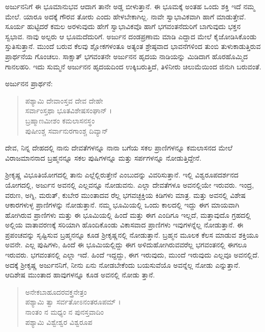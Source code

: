 ಅರ್ಜುನನಿಗೆ ಈ ಭೂಮಾನುಭವ ಆದಾಗ ತಾನೇ ಅಡ್ಡ ಬೀಳುತ್ತಾನೆ. ಈ ಭೂಮಕ್ಕೆ ಅಂತಹ ಒಂದು ಶಕ್ತಿ ಇದೆ ನಮ್ಮ ಮೇಲೆ. ಯಾರೂ ಅದಕ್ಕೆ ಗೌರವ ತೋರು ಎಂದು ಹೇಳಬೇಕಾಗಿಲ್ಲ. ನಾವೇ ಸ್ವಾಭಾವಿಕವಾಗಿ ಹಾಗೆ ಮಾಡುತ್ತೇವೆ. ಸೂರ್ಯ ಹುಟ್ಟಿದರೆ ಕಮಲ ಅರಳುವುದು ಹೇಗೆ ಸ್ವಾಭಾವಿಕವೊ ಹಾಗೆ ಭಗವಂತನೆದುರಿಗೆ ಬಾಗುವುದು ಭಕ್ತನ ಸ್ವಭಾವ. ನಾವು ಅಲ್ಪರು ಆ ಭೂಮದೆದುರಿಗೆ. ಅರ್ಜುನ ದಂಡಪ್ರಣಾಮ ಮಾಡಿ ಎದ್ದಾದ ಮೇಲೆ ಕೈಜೋಡಿಸಿಕೊಂಡು ಸ್ತುತಿಸುತ್ತಾನೆ. ಮುಂದೆ ಬರುವ ಕೆಲವು ಶ್ಲೋಕಗಳಂತೂ ಅತ್ಯಂತ ಶ್ರೇಷ್ಠವಾದ ಭಾವನೆಗಳಿಂದ ತುಂಬಿ ತುಳುಕಾಡುತ್ತಿರುವ ಪ್ರಾರ್ಥನೆಯ ಗೊಂಚಲು. ಸಾಕ್ಷಾತ್ ಭಗವಂತನೇ ಅರ್ಜುನನ ಹೃದಯ ನಾಡಿಯನ್ನು ಮಿಡಿದಾಗ ಹೊರಹೊಮ್ಮಿದ ಗಾನಲಹರಿ. ಇದು ಸುಮ್ಮನೆ ಅರ್ಜುನನ ಹೃದಯದಿಂದ ಉಕ್ಕಿಬರುತ್ತಿದೆ, ತಿಳಿನೀರು ಚಿಲುಮೆಯಿಂದ ಜಿನುಗಿ ಬರುವಂತೆ.

ಅರ್ಜುನನ ಪ್ರಾರ್ಥನೆ:

\begin{verse}
ಪಶ್ಯಾಮಿ ದೇವಾಂಸ್ತವ ದೇವ ದೇಹೇ\\ ಸರ್ವಾಂಸ್ತಥಾ ಭೂತವಿಶೇಷಸಂಘಾನ್ ।\\ಬ್ರಹ್ಮಾಣಮೀಶಂ ಕಮಲಾಸನಸ್ಥಂ\\ ಪುಷೀಂಶ್ಚ ಸರ್ವಾನುರಗಾಂಶ್ಚ ದಿವ್ಯಾನ್ 
\end{verse}

{\small ದೇವ, ನಿನ್ನ ದೇಹದಲ್ಲಿ ನಾನು ದೇವತೆಗಳನ್ನೂ ನಾನಾ ಬಗೆಯ ಸಕಲ ಪ್ರಾಣಿಗಳನ್ನೂ ಕಮಲಾಸನದ ಮೇಲೆ ವಿರಾಜಮಾನನಾದ ಬ್ರಹ್ಮನನ್ನೂ ಸಕಲ ಪುಷಿಗಳನ್ನೂ ಮತ್ತು ಸರ್ಪಗಳನ್ನೂ ನೋಡುತ್ತಿದ್ದೇನೆ.}

ಶ್ರೀಕೃಷ್ಣ ವಿಭೂತಿಯೋಗದಲ್ಲಿ ತಾನು ಎಲ್ಲೆಲ್ಲಿರುತ್ತೇನೆ ಎಂಬುದನ್ನು ವಿವರಿಸುತ್ತಾನೆ. ಇಲ್ಲಿ ವಿಶ್ವರೂಪದರ್ಶನದ ಯೋಗದಲ್ಲಿ, ಅರ್ಜುನ ಅವನಲ್ಲಿ ಎಲ್ಲವನ್ನೂ ನೋಡುವನು. ಎಲ್ಲಾ ದೇವತೆಗಳೂ ಅವನಲ್ಲಿಯೇ ಇರುವರು. ಇಂದ್ರ, ವರುಣ, ಅಗ್ನಿ, ಮರುತ್, ಕುಬೇರ ಮುಂತಾದವ ರೆಲ್ಲ ಭಗವಚ್ಛಕ್ತಿಯ ಕಿಡಿಗಳು ಮಾತ್ರ. ಮತ್ತು ಅವನಲ್ಲಿ ವಿಶೇಷ ಆಕಾರಗಳುಳ್ಳ ಪ್ರಾಣಿಗಳನ್ನು ನೋಡುತ್ತಾನೆ. ನಮ್ಮ ಭೂಮಿಯಲ್ಲಿ ಒಂದು ಕಾಲದಲ್ಲಿ ಇದ್ದು ಈಗ ಮಾಯವಾಗಿ ಹೋಗಿರುವ ಪ್ರಾಣಿಗಳು ಮತ್ತು ಈ ಭೂಮಿಯಲ್ಲಿ ಹಿಂದೆ ಮತ್ತು ಈಗ ಎಂದಿಗೂ ಇಲ್ಲದೆ, ಮತ್ತಾವುದೊ ಗ್ರಹದಲ್ಲಿ ಅಲ್ಲಿಯ ವಾತಾವರಣಕ್ಕೆ ಸರಿಯಾಗಿ ಹೊಂದಿಕೊಂಡು ವಿಕಾಸವಾದ ಪ್ರಾಣಿಗಳು ಇವುಗಳನ್ನೆಲ್ಲ ನೋಡುತ್ತಾನೆ. ಈ ಪ್ರಪಂಚವನ್ನು ಸೃಷ್ಟಿಸುವ ಬ್ರಹ್ಮನನ್ನೂ ಕೂಡ ಶ್ರೀಕೃಷ್ಣನಲ್ಲಿ ನೋಡುತ್ತಾನೆ. ಬ್ರಹ್ಮನ ಮೂಲಕ ಕೆಲಸ ಮಾಡುವ ಶಕ್ತಿಯೂ ಅವನೇ. ಎಲ್ಲ ಪುಷಿಗಳು, ಹಿಂದೆ ಈ ಭೂಮಿಯಲ್ಲಿದ್ದು ಈಗ ಅಳಿದುಹೋಗಿರುವವರೆಲ್ಲ ಭಗವಂತನಲ್ಲಿ ಈಗಲೂ ಇರುವರು. ಭಗವಂತನಲ್ಲಿ ಎಲ್ಲಾ ಇದೆ. ಹಿಂದೆ ಇದ್ದದ್ದು, ಈಗ ಇರುವುದು, ಮುಂದೆ ಇರುವುದು ಎಲ್ಲವೂ ಅವನಲ್ಲಿದೆ. ಅದಕ್ಕೆ ಶ್ರೀಕೃಷ್ಣ ಅರ್ಜುನನಿಗೆ, ನೀನು ಏನು ನೋಡಬೇಕೆಂದು ಬಯಸುವೆಯೊ ಅವನ್ನೆಲ್ಲ ನೋಡು ಎನ್ನುತ್ತಾನೆ. ಆದಿಶೇಷ ಮುಂತಾದ ಹಾವುಗಳನ್ನೂ ಕೂಡ ಅವನಲ್ಲಿ ನೋಡು ತ್ತಾನೆ.

\begin{verse}
ಅನೇಕಬಾಹೂದರವಕ್ತ್ರನೇತ್ರಂ \\ ಪಶ್ಯಾಮಿ ತ್ವಾ ಸರ್ವತೋಽನಂತರೂಪಮ್ ।\\ನಾಂತಂ ನ ಮಧ್ಯಂ ನ ಪುನಸ್ತವಾದಿಂ\\ ಪಶ್ಯಾಮಿ ವಿಶ್ವೇಶ್ವರ ವಿಶ್ವರೂಪ 
\end{verse}

